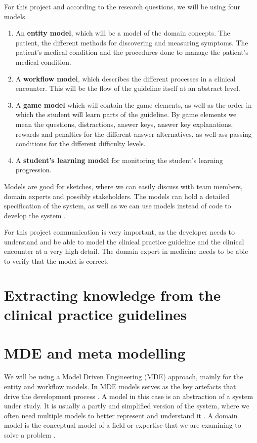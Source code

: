 
For this project and according to the research questions, we will be using four models.
\begin{enumerate}
	\item An \textbf{entity model}, which will be a model of the domain concepts. The patient, the different methods for discovering and measuring symptoms. The patient's medical condition and the procedures done to manage the patient's medical condition.
	\item A \textbf{workflow model}, which describes the different processes in a clinical encounter. This will be the flow of the guideline itself at an abstract level.
	\item A \textbf{game model} which will contain the game elements, as well as the order in which the student will learn parts of the guideline. By game elements we mean the questions, distractions, answer keys, answer key explanations, rewards and penalties for the different answer alternatives, as well ass passing conditions for the different difficulty levels.
	\item A \textbf{student's learning model} for monitoring the student's learning progression.
\end{enumerate}

Models are good for sketches, where we can easily discuss with team members, domain experts and possibly stakeholders. The models can hold a detailed specification of the system, as well as we can use models instead of code to develop the system \parencite{Brambilla2017}.

For this project communication is very important, as the developer needs to understand and be able to model the clinical practice guideline and the clinical encounter at a very high detail. The domain expert in medicine needs to be able to verify that the model is correct.

\section{Extracting knowledge from the clinical  practice guidelines}

\section{MDE and meta modelling}
We will be using a Model Driven Engineering (MDE) approach, mainly for the entity and workflow models. In MDE models serves as the key artefacts that drive the development process \parencite{RodriguesdaSilva2015}. A model in this case is an abstraction of a system under study. It is usually a partly and simplified version of the system, where we often need multiple models to better represent and understand it \parencite{RodriguesdaSilva2015}. A domain model is the conceptual model of a field or expertise that we are examining to solve a problem \parencite{Brambilla2017}.

